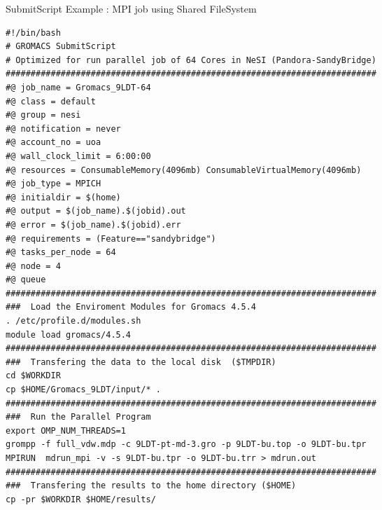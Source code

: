 \documentclass[final,t]{beamer}
\begin{document}
\begin{frame}[fragile]{}
\begin{columns}[t]
\begin{column}{.3\linewidth}
    \end{column}

    
    \begin{column}{.35\linewidth}
    
      \begin{block}{SubmitScript Example : MPI job using Shared FileSystem}
              \vspace*{-3ex}
        \begin{verbatim}
#!/bin/bash 
# GROMACS SubmitScript 
# Optimized for run parallel job of 64 Cores in NeSI (Pandora-SandyBridge)
##########################################################################
#@ job_name = Gromacs_9LDT-64
#@ class = default
#@ group = nesi
#@ notification = never
#@ account_no = uoa
#@ wall_clock_limit = 6:00:00
#@ resources = ConsumableMemory(4096mb) ConsumableVirtualMemory(4096mb)
#@ job_type = MPICH
#@ initialdir = $(home)
#@ output = $(job_name).$(jobid).out
#@ error = $(job_name).$(jobid).err
#@ requirements = (Feature=="sandybridge")
#@ tasks_per_node = 64
#@ node = 4
#@ queue
########################################################################## 
###  Load the Enviroment Modules for Gromacs 4.5.4
. /etc/profile.d/modules.sh
module load gromacs/4.5.4
########################################################################## 
###  Transfering the data to the local disk  ($TMPDIR)
cd $WORKDIR
cp $HOME/Gromacs_9LDT/input/* .
########################################################################## 
###  Run the Parallel Program
export OMP_NUM_THREADS=1
grompp -f full_vdw.mdp -c 9LDT-pt-md-3.gro -p 9LDT-bu.top -o 9LDT-bu.tpr
MPIRUN  mdrun_mpi -v -s 9LDT-bu.tpr -o 9LDT-bu.trr > mdrun.out 
########################################################################## 
###  Transfering the results to the home directory ($HOME) 
cp -pr $WORKDIR $HOME/results/
        \end{verbatim}
        \vspace*{-4ex}
      \end{block}


\end{column}
\end{columns}
\end{frame}
\end{document}
